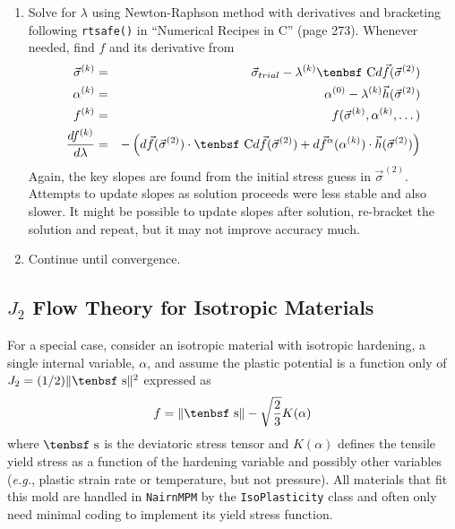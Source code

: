 \documentclass[11pt]{article}
\def\C{\hbox{\tenbsf C}}
\def\dev{\hbox{\tenbsf s}}
\def\df{d \vec{f}}
\def\dfa{d \vec{f}^\alpha}
\def\s#1{\sigma_{#1}}
\begin{document}
\begin{enumerate}
\item Solve for $\lambda$ using Newton-Raphson method with derivatives and bracketing following {\tt rtsafe()} in ``Numerical Recipes in C'' (page 273). Whenever needed, find $f$ and its derivative from
\begin{eqnarray}
      {\vec\s{}}^{(k)} & = & {\vec\s{trial}} - \lambda^{(k)}\C\df({\vec\s{}}^{(2)}) \\
      \alpha^{(k)} & = & \alpha^{(0)} - \lambda^{(k)} \vec h({\vec\s{}}^{(2)}) \\
      f^{(k)} & = &  f({\vec\s{}}^{(k)},\alpha^{(k)} ,\dots)  \\
      {df^{(k)}\over d\lambda} & = & -\left( \df({\vec\s{}}^{(2)})\cdot \C\df({\vec\s{}}^{(2)}) + \dfa(\alpha^{(k)}) \cdot \vec h({\vec\s{}}^{(2)})\right) 
\end{eqnarray}
Again, the key slopes are found from the initial stress guess in ${\vec\s{}}^{(2)}$. Attempts to update slopes as solution proceeds were less stable and also slower. It might be possible to update slopes after solution, re-bracket the solution and repeat, but it may not improve accuracy much.

\item Continue until convergence.

\end{enumerate}

\subsection{$J_2$ Flow Theory for Isotropic Materials}

For a special case, consider an isotropic material with isotropic hardening, a single internal variable, $\alpha$, and assume the plastic potential is a function only of $J_2= (1/2)\|\dev\|^2$ expressed as
\begin{equation}
      f = \|\dev\| - \sqrt{2\over3} K(\alpha)
\end{equation}
where $\dev$ is the deviatoric stress tensor and $K(\alpha)$ defines the tensile yield stress as a function of the hardening variable and possibly other variables ({\it e.g.}, plastic strain rate or temperature, but not pressure). All materials that fit this mold are handled in {\tt NairnMPM} by the {\tt IsoPlasticity} class and often only need minimal coding to implement its yield stress function.
\end{document}
